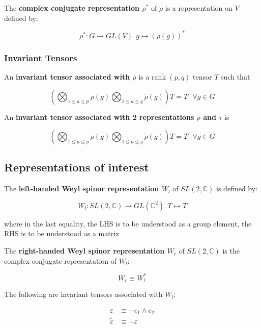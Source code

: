        \begin{defn}

            The \textbf{complex conjugate representation $\rho^*$} of $\rho$ is a representation on $V$ defined by:

            $$ \rho^*: G \to GL(V) ~~ g \mapsto (\rho(g))^* $$

        \end{defn}


    \subsubsection{Invariant Tensors}

        \begin{defn}
            An \textbf{invariant tensor associated with $\rho$} is a rank $(p, q)$ tensor $T$ such that

            $$
                \left( \bigotimes_{1 \le a \le p} \rho(g) \bigotimes_{1 \le a \le q} \tilde \rho(g) \right) T = T
                ~~~ \forall g \in G$$
        \end{defn}

        \begin{defn}
            An \textbf{invariant tensor associated with 2 representations $\rho$ and $\tau$} is 

            $$
                \left( \bigotimes_{1 \le a \le p} \rho(g) \bigotimes_{1 \le a \le q} \tilde \rho(g) \right) T = T
                ~~~ \forall g \in G$$
        \end{defn}


\subsection{Representations of interest}

    \begin{defn}

        The \textbf{left-handed Weyl spinor representation $W_l$} of $SL(2, \mathbb{C})$ is defined by:

        $$ W_l: SL(2, \mathbb{C}) \to GL(\mathbb{C}^2)  ~~ T \mapsto T $$

        where in the last equality, the LHS is to be understood as a group element, the RHS is to be understood as a matrix

    \end{defn}

    \begin{defn}

        The \textbf{right-handed Weyl spinor representation $W_r$} of $SL(2, \mathbb{C})$ is the complex conjugate representation of $W_l$:

        $$ W_r \equiv W_l ^ *$$


    \end{defn}


    \begin{thm}
        The following are invariant tensors associated with $W_l$:

        \begin{align*}
                   \varepsilon &\equiv  - e_1 \wedge e_2 \\
            \tilde \varepsilon &\equiv  - \varepsilon
        \end{align*}

    \end{thm}